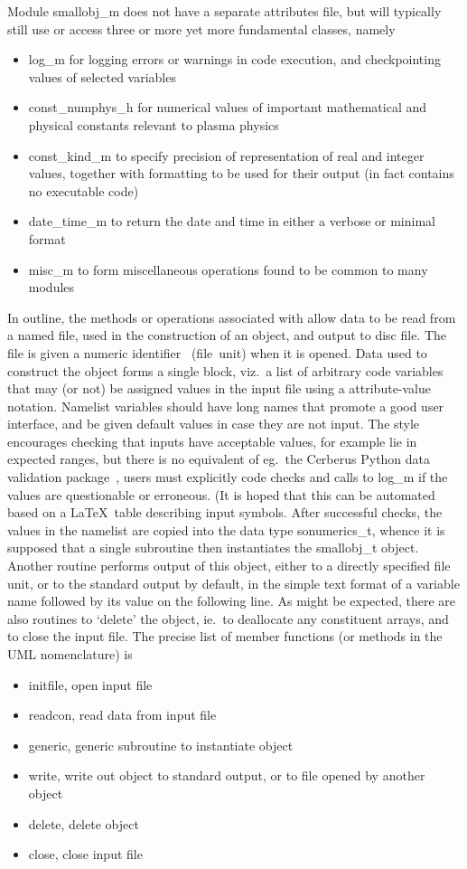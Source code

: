 Module smallobj\_m does not have a separate attributes file, but will typically still use or access
three or more yet more fundamental classes, namely
\begin{itemize}
\item log\_m for logging errors or warnings in code execution, and checkpointing values of selected variables
\item const\_numphys\_h for numerical values of important mathematical and physical constants relevant to plasma physics
\item const\_kind\_m to specify precision of representation of real and integer values, together 
with formatting to be used for their output (in fact contains no executable code)
\item date\_time\_m to return the date and time in either a verbose or minimal format
\item misc\_m to form miscellaneous operations found to be common to many modules
\end{itemize}
In outline, the  methods or operations associated with  allow data to be read from a named file,
used in the construction of an object, and output to disc file. The file is given a numeric identifier~
(file~unit) when it is opened. Data used to construct the  object forms a single  block, viz.\ 
a list of arbitrary code variables that may (or not) be assigned values in the input file using a attribute-value notation.
Namelist variables should have long names that promote a good user interface, and
be given default values in case they are not input.
The style encourages checking that inputs have acceptable values, for example lie in expected ranges,
but there is no equivalent of eg.\ the Cerberus Python data validation package~\cite{cerberuswebsite},
users must explicitly code checks and calls
to log\_m if the values are questionable or erroneous. (It is hoped that this can be automated based
on a \LaTeX \ table describing input symbols. After successful checks, the values in
the namelist are copied into the data type sonumerics\_t, whence it is supposed that a single subroutine then
instantiates the smallobj\_t object. Another routine performs
output of this object, either to a directly specified file unit, or
to the standard output by default, in the simple text format of a variable name followed by its value on the following
line. As might be expected, there are also routines to `delete' the object, ie.\ to deallocate
any constituent arrays, and to close the input file.
The precise list of member functions (or methods in the UML nomenclature) is
\begin{itemize}
\item initfile,  open input file
\item readcon,  read data from input file
\item generic,  generic subroutine to instantiate object
\item write, write out object to standard output, or to file opened by another object
\item delete, delete object
\item close, close input file
\end{itemize}


